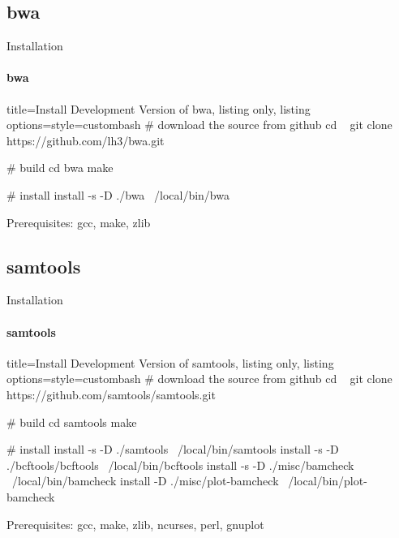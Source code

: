 \documentclass{beamer}
\begin{document}
\subsection*{bwa}
\begin{frame}[fragile]{Installation}
\framesubtitle{bwa}
\begin{tcblisting}{title={Install Development Version of bwa}, listing only, listing options={style=custombash}}
# download the source from github
cd ~
git clone https://github.com/lh3/bwa.git

# build 
cd bwa
make 

# install
install -s -D ./bwa ~/local/bin/bwa
\end{tcblisting}

Prerequisites: 
gcc,
make,
zlib 

\end{frame}


\subsection*{samtools}
\begin{frame}[fragile]{Installation}
\framesubtitle{samtools}
\begin{tcblisting}{title={Install Development Version of samtools}, listing only, listing options={style=custombash}}
# download the source from github
cd ~
git clone https://github.com/samtools/samtools.git

# build 
cd samtools
make

# install
install -s -D ./samtools ~/local/bin/samtools
install -s -D ./bcftools/bcftools ~/local/bin/bcftools
install -s -D ./misc/bamcheck ~/local/bin/bamcheck
install -D ./misc/plot-bamcheck ~/local/bin/plot-bamcheck
\end{tcblisting}

Prerequisites: 
gcc,
make,
zlib, 
ncurses, 
perl, %
gnuplot %

\end{frame}
\end{document}
